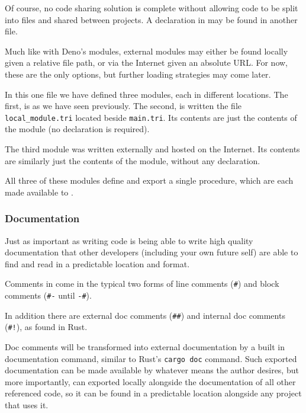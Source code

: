 Of course, no code sharing solution is complete without allowing code
to be split into files and shared between projects. A  declaration
in \Trilogy{} may be found in another file.

Much like with Deno's modules, external modules may either be found locally
given a relative file path, or via the Internet given an absolute URL\@. For
now, these are the only options, but further loading strategies may come
later.


In this one file we have defined three modules, each in different locations.
The first,  is as we have seen previously. The second,
 is written the file \texttt{local\_module.tri} located
beside \texttt{main.tri}. Its contents are just the contents of the module
(no  declaration is required).


The third module was written externally and hosted on the Internet.
Its contents are similarly just the contents of the module, without
any declaration.


All three of these modules define and export a single procedure, which
are each made available to .

\subsubsection{Documentation}

Just as important as writing code is being able to write high quality
documentation that other developers (including your own future self)
are able to find and read in a predictable location and format.

Comments in \Trilogy{} come in the typical two forms of line comments
(\texttt{\#}) and block comments (\texttt{\#-} until \texttt{-\#}).

In addition there are external doc comments (\texttt{\#\#}) and internal
doc comments (\texttt{\#!}), as found in Rust.


Doc comments will be transformed into external documentation by a built
in documentation command, similar to Rust's \texttt{cargo doc} command.
Such exported documentation can be made available by whatever means the
author desires, but more importantly, can exported locally alongside the
documentation of all other referenced code, so it can be found in a
predictable location alongside any project that uses it.

